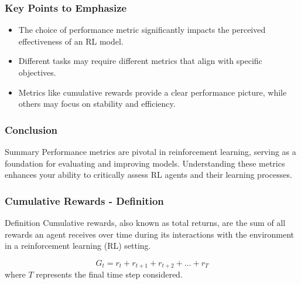 \documentclass[aspectratio=169]{beamer}
\begin{document}
\begin{frame}[fragile]
    \frametitle{Key Points to Emphasize}
    \begin{itemize}
        \item The choice of performance metric significantly impacts the perceived effectiveness of an RL model.
        \item Different tasks may require different metrics that align with specific objectives.
        \item Metrics like cumulative rewards provide a clear performance picture, while others may focus on stability and efficiency.
    \end{itemize}
\end{frame}

\begin{frame}[fragile]
    \frametitle{Conclusion}
    \begin{block}{Summary}
        Performance metrics are pivotal in reinforcement learning, serving as a foundation for evaluating and improving models. Understanding these metrics enhances your ability to critically assess RL agents and their learning processes.
    \end{block}
\end{frame}

\begin{frame}[fragile]
    \frametitle{Cumulative Rewards - Definition}
    \begin{block}{Definition}
        Cumulative rewards, also known as total returns, are the sum of all rewards an agent receives over time during its interactions with the environment in a reinforcement learning (RL) setting.
    \end{block}
    \begin{equation}
        G_t = r_t + r_{t+1} + r_{t+2} + \ldots + r_T
    \end{equation}
    where \( T \) represents the final time step considered.
\end{frame}
\end{document}
